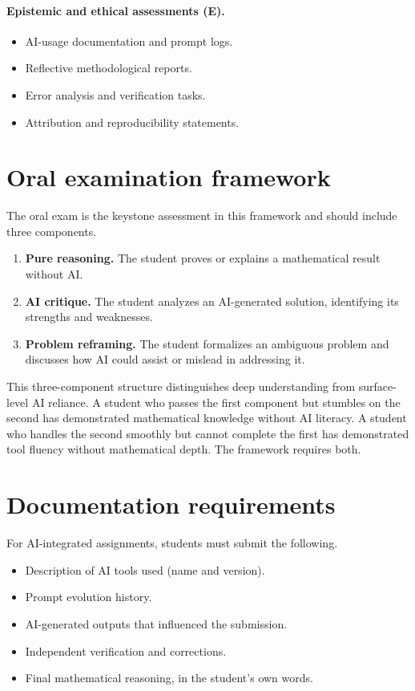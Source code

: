 \documentclass{SIAMbook2023}
\begin{document}
\paragraph{Epistemic and ethical assessments (E).}
\begin{itemize}
\item AI-usage documentation and prompt logs.
\item Reflective methodological reports.
\item Error analysis and verification tasks.
\item Attribution and reproducibility statements.
\end{itemize}

\section{Oral examination framework}

The oral exam is the keystone assessment in this framework and should include three components.

\begin{enumerate}
\item \textbf{Pure reasoning.} The student proves or explains a mathematical result without AI.
\item \textbf{AI critique.} The student analyzes an AI-generated solution, identifying its strengths and weaknesses.
\item \textbf{Problem reframing.} The student formalizes an ambiguous problem and discusses how AI could assist or mislead in addressing it.
\end{enumerate}

This three-component structure distinguishes deep understanding from surface-level AI reliance. A student who passes the first component but stumbles on the second has demonstrated mathematical knowledge without AI literacy. A student who handles the second smoothly but cannot complete the first has demonstrated tool fluency without mathematical depth. The framework requires both.

\section{Documentation requirements}

For AI-integrated assignments, students must submit the following.

\begin{itemize}
\item Description of AI tools used (name and version).
\item Prompt evolution history.
\item AI-generated outputs that influenced the submission.
\item Independent verification and corrections.
\item Final mathematical reasoning, in the student's own words.
\end{itemize}
\end{document}

